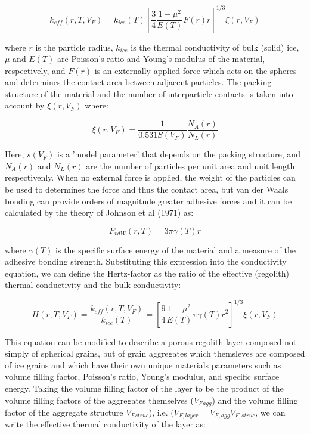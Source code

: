 \documentclass[11pt]{article} %
\newcommand{\vf}{\ensuremath{V_{F}}\xspace}
\begin{document}
	\begin{equation}
	k_{eff}(r, T, \vf) = k_{ice}(T) [\frac{3}{4} \frac{1 - \mu^{2}}{E(T)} F(r) r]^{1/3} \xi(r, \vf)
	\end{equation}
	
	 where $r$ is the particle radius, $k_{ice}$ is the thermal conductivity of bulk (solid) ice, $\mu$ and $E(T)$ are Poisson's ratio and Young's modulus of the material, respectively, and $F(r)$ is an externally applied force which acts on the spheres and determines the contact area between adjacent particles. The packing structure of the material and the number of interparticle contacts is taken into account by $\xi(r, \vf)$ where:
	
	\begin{equation}
	\xi(r, \vf) = \frac{1}{0.531 S(\vf)} \frac{N_{A}(r)}{N_{L}(r)}
	\end{equation}
	 
	 Here, $s(\vf)$ is a 'model parameter' that depends on the packing structure, and $N_{A}(r)$ and $N_{L}(r)$ are the number of particles per unit area and unit length respectivenly.  When no external force is applied, the weight of the particles can be used to determines the force and thus the contact area, but van der Waals bonding can provide orders of magnitude greater adhesive forces and it can be calculated by the theory of Johnson et al (1971) as:
	 
	 \begin{equation}
	 F_{vdW}(r, T) = 3 \pi \gamma(T) r
	 \end{equation} 
	 
	 where $\gamma(T)$ is the specific surface energy of the material and a measure of the adhesive bonding strength. Substituting this expression into the conductivity equation, we can define the Hertz-factor as the ratio of the effective (regolith) thermal conductivity and the bulk conductivity:
	 
	 \begin{equation}
	 H(r, T, \vf) = \frac{k_{eff}(r, T, \vf)}{k_{ice}(T)} = [\frac{9}{4} \frac{1-\mu^{2}}{E(T)} \pi \gamma(T) r^{2} ]^{1/3} \xi(r, \vf)
	 \end{equation}
	 
	 This equation can be modified to describe a porous regolith layer composed not simply of spherical grains, but of grain aggregates which themsleves are composed of ice grains and which have their own unique materials parameters such as volume filling factor, Poisson's ratio, Young's modulus, and specific surface energy. Taking the volume filling factor of the layer to be the product of the volume filling factors of the aggregates themselves (\vf$_{agg}$) and the volume filling factor of the aggregate structure \vf$_{struc}$), i.e. ($V_{F, layer} = V_{F, agg} V_{F, struc}$, we can write the effective thermal conductivity of the layer as:
	 
\end{document}
